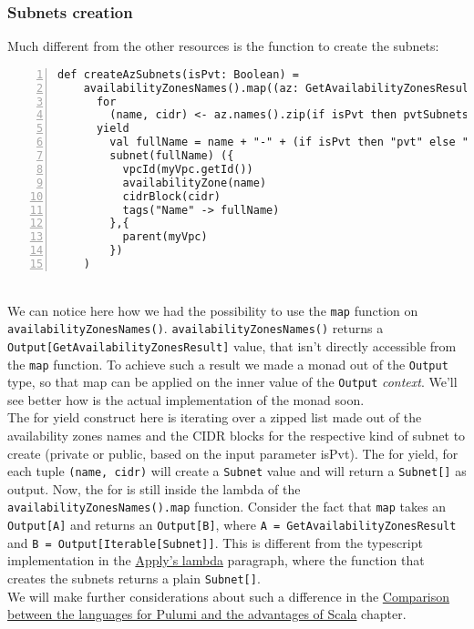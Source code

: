 \subsubsection{Subnets creation}
\label{sssec:subnets-creation}
Much different from the other resources is the function to create the subnets:
\begin{lstlisting}[numbers=left, numberstyle=\tiny, numbersep=-5pt, stepnumber=1,linewidth=420pt]
  def createAzSubnets(isPvt: Boolean) =
    availabilityZonesNames().map((az: GetAvailabilityZonesResult) =>
      for
        (name, cidr) <- az.names().zip(if isPvt then pvtSubnetsCidrs else pubSubnetsCidrs)
      yield
        val fullName = name + "-" + (if isPvt then "pvt" else "pub") + "-subnet-scala"
        subnet(fullName) ({
          vpcId(myVpc.getId())
          availabilityZone(name)
          cidrBlock(cidr)
          tags("Name" -> fullName)
        },{
          parent(myVpc)
        })
    )
\end{lstlisting}\mbox{}\\
We can notice here how we had the possibility to use the \texttt{map} function on \texttt{availabilityZonesNames()}.
\texttt{availabilityZonesNames()} returns a \texttt{Output[GetAvailabilityZonesResult]} value, that isn't directly accessible from the \texttt{map} function.
To achieve such a result we made a monad out of the \texttt{Output} type, so that map can be applied on the inner value of the \texttt{Output} \textit{context}.
We'll see better how is the actual implementation of the monad soon.\\
The for yield construct here is iterating over a zipped list made out of the availability zones names and the CIDR blocks for the respective kind of subnet to create (private or public, based on the input parameter isPvt).
The for yield, for each tuple \texttt{(name, cidr)} will create a \texttt{Subnet} value and will return a \texttt{Subnet[]} as output.
Now, the for is still inside the lambda of the \texttt{availabilityZonesNames().map} function.
Consider the fact that \texttt{map} takes an \texttt{Output[A]} and returns an \texttt{Output[B]}, where \texttt{A = GetAvailabilityZonesResult} and \texttt{B = Output[Iterable[Subnet]]}.
This is different from the typescript implementation in the \hyperref[par:ts-lambda]{Apply's lambda} paragraph, where the function that creates the subnets returns a plain \texttt{Subnet[]}.\\
We will make further considerations about such a difference in the \hyperref[cap:comparisons]{Comparison between the languages for Pulumi and the advantages of Scala} chapter.\\


